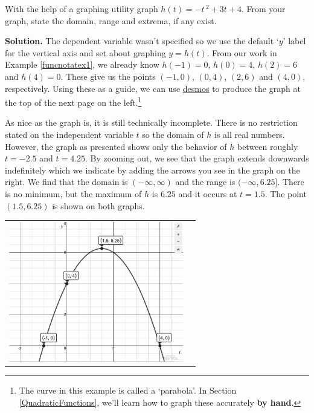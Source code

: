 \documentclass{ximera}
\begin{document}
\begin{ex} \label{graphalgebraicex}  With the help of a graphing utility graph $h(t) = -t\,^{2} + 3t + 4$.  From your graph, state the domain, range and extrema, if any exist.

{\bf Solution.} The dependent variable wasn't specified so we use the default `$y$' label for the vertical axis and set about graphing $y = h(t)$.   From our work in Example \ref{funcnotatex1},  we already know  $h(-1) = 0$, $h(0) = 4$, $h(2) = 6$ and $h(4) = 0$.  These give us the points $(-1,0)$, $(0,4)$, $(2,6)$ and $(4,0)$, respectively.  Using these as a guide, we can use  \href{https://www.desmos.com/}{\underline{desmos}} to produce the graph at the top of the next page on the left.\footnote{The curve in this example is called a 	`parabola'.  In Section \ref{QuadraticFunctions}, we'll learn how to graph these accurately \textbf{by hand}.} 

\medskip

As nice as the graph is, it is still technically incomplete.  There is no restriction stated on the independent variable $t$ so the domain of $h$ is all real numbers. However, the graph as presented shows only the behavior of $h$ between roughly $t = -2.5$ and $t = 4.25$.  By zooming out, we see that the graph extends downwards indefinitely which we indicate by adding the arrows you see in the graph on the right.  We find that the domain is $(-\infty, \infty)$ and the range is $(-\infty, 6.25]$.  There is no minimum, but the  maximum of $h$ is $6.25$ and it occurs at $t = 1.5$.  The point $(1.5, 6.25)$ is shown on both graphs.

\begin{center}

\begin{tabular}{m{3in}m{2in}}


\includegraphics[width=3in]{./FunctionsandtheirRepresentationsGraphics/ParabolaGraph.jpg}


\end{tabular}
\end{center}
\end{ex}
\end{document}
